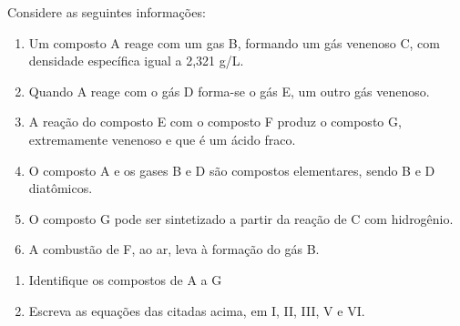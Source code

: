 Considere as seguintes informações:

\begin{enumerate}[label = (\Roman*)]
	\item Um composto A reage com um gas B, formando um gás venenoso C, com densidade específica igual a 2,321 g/L.
	\item Quando A reage com o gás D forma-se o gás E, um outro gás venenoso.
	\item A reação do composto E com o composto F produz o composto G, extremamente venenoso e que é um ácido fraco.
	\item O composto A e os gases B e D são compostos elementares, sendo B e D diatômicos.
	\item O composto G pode ser sintetizado a partir da reação de C com hidrogênio.
	\item A combustão de F, ao ar, leva à formação do gás B.
\end{enumerate}

\begin{enumerate}[label = (\alph*)]
	\item Identifique os compostos de A a G
	\item Escreva as equações das citadas acima, em I, II, III, V e VI.
\end{enumerate}
